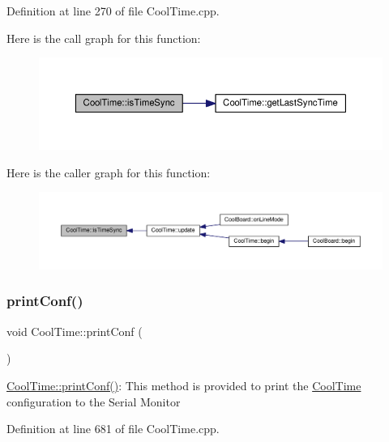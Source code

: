 Definition at line 270 of file Cool\+Time.\+cpp.

Here is the call graph for this function\+:\nopagebreak
\begin{figure}[H]
\begin{center}
\leavevmode
\includegraphics[width=350pt]{class_cool_time_a5ae038a4498602b189f76a10bf02adf8_cgraph}
\end{center}
\end{figure}
Here is the caller graph for this function\+:\nopagebreak
\begin{figure}[H]
\begin{center}
\leavevmode
\includegraphics[width=350pt]{class_cool_time_a5ae038a4498602b189f76a10bf02adf8_icgraph}
\end{center}
\end{figure}
\mbox{\label{class_cool_time_af355e7f9b3898211cd2ff25eab5933b1}} 
\subsubsection{\texorpdfstring{print\+Conf()}{printConf()}}
{\footnotesize\ttfamily void Cool\+Time\+::print\+Conf (\begin{DoxyParamCaption}{ }\end{DoxyParamCaption})}

\hyperlink{class_cool_time_af355e7f9b3898211cd2ff25eab5933b1}{Cool\+Time\+::print\+Conf()}\+: This method is provided to print the \hyperlink{class_cool_time}{Cool\+Time} configuration to the Serial Monitor 

Definition at line 681 of file Cool\+Time.\+cpp.

